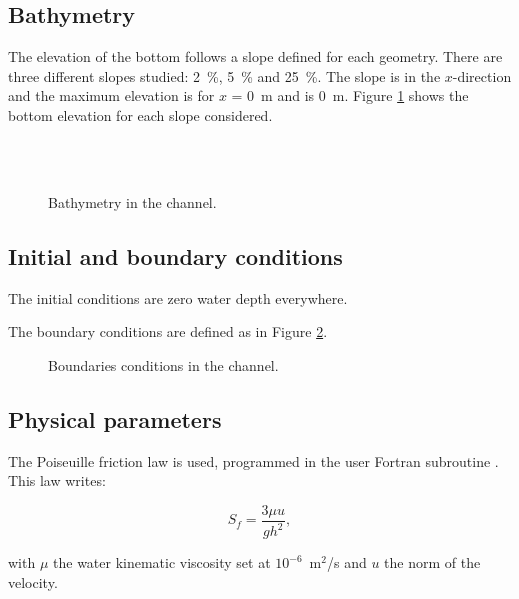 \subsection{Bathymetry}
The elevation of the bottom follows a slope defined for each geometry.
There are three different slopes studied: 2~\%, 5~\% and 25~\%.
The slope is in the $x$-direction and the maximum elevation is for $x$ = 0~m and
is 0~m.
Figure \ref{t2d:rain_runoff:fig:bathy} shows the bottom elevation for each
slope considered.

\begin{figure}[H]
 \centering
 \\
 \\
 \caption{Bathymetry in the channel.}
 \label{t2d:rain_runoff:fig:bathy}
\end{figure}

\subsection{Initial and boundary conditions}

The initial conditions are zero water depth everywhere.

The boundary conditions are defined as in Figure \ref{t2d:rain_runoff:fig:bcd}.

\begin{figure}[H]
 \centering
 \caption{Boundaries conditions in the channel.}
 \label{t2d:rain_runoff:fig:bcd}
\end{figure}

\subsection{Physical parameters}
\label{t2d:rain_runoff:physical_parameters}

The Poiseuille friction law is used, programmed in the user Fortran subroutine
. This law writes:

\begin{equation}
 S_f=\frac{3\mu u}{gh^2},
\end{equation}

with $\mu$ the water kinematic viscosity set at $10^{-6}$~m$^2$/s
and $u$ the norm of the velocity.

